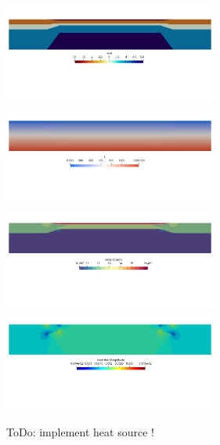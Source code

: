 \begin{center}
\includegraphics[width=7cm]{python_codes/fieldstone_86/results/mats}
\includegraphics[width=7cm]{python_codes/fieldstone_86/results/T}\\
\includegraphics[width=7cm]{python_codes/fieldstone_86/results/dTdy}
\includegraphics[width=7cm]{python_codes/fieldstone_86/results/heatflux}
\end{center}






ToDo: implement heat source !
